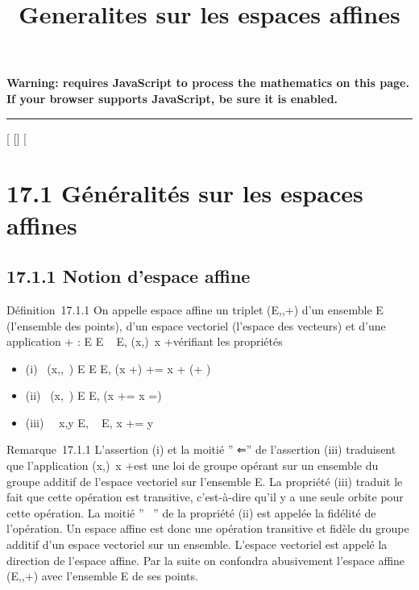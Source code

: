 \documentclass[]{article}
\title{Generalites sur les espaces affines}
\author{}
\date{}
\begin{document}
\maketitle

\textbf{Warning: 
requires JavaScript to process the mathematics on this page.\\ If your
browser supports JavaScript, be sure it is enabled.}

\begin{center}\rule{3in}{0.4pt}\end{center}

[
[]
[

\section{17.1 Généralités sur les espaces affines}

\subsection{17.1.1 Notion d'espace affine}

Définition~17.1.1 On appelle espace affine un triplet
(E,\overrightarrowE,+) d'un ensemble E (l'ensemble
des points), d'un espace vectoriel \overrightarrowE
(l'espace des vecteurs) et d'une application + : E
\times\overrightarrow E \rightarrow~ E,
(x,\overrightarrow\xi)\mapsto~x
+\overrightarrow \xi vérifiant les propriétés

\begin{itemize}
\itemsep1pt\parskip0pt
\item
  (i)
  \forall~(x,\overrightarrow\xi,\overrightarrow\eta~)
  \in E \times\overrightarrow E
  \times\overrightarrow E, (x
  +\overrightarrow \xi)
  +\overrightarrow \eta = x +
  (\overrightarrow\xi +\overrightarrow
  \eta)
\item
  (ii)
  \forall~(x,\overrightarrow\xi~) \in E
  \times\overrightarrow E, \left (x
  +\overrightarrow \xi = x \Leftrightarrow
  \overrightarrow\xi =\right )
\item
  (iii) \forall~~x,y \in E,
  \exists\overrightarrow\xi~
  \in\overrightarrow E, x
  +\overrightarrow \xi = y
\end{itemize}

Remarque~17.1.1 L'assertion (i) et la moitié '' ⇐'' de l'assertion (iii)
traduisent que l'application
(x,\overrightarrow\xi)\mapsto~x
+\overrightarrow \xi est une loi de groupe opérant sur
un ensemble du groupe additif de l'espace vectoriel
\overrightarrowE sur l'ensemble E. La propriété (iii)
traduit le fait que cette opération est transitive, c'est-à-dire qu'il y
a une seule orbite pour cette opération. La moitié '' \rigtharrow~'' de la
propriété (ii) est appelée la fidélité de l'opération. Un espace affine
est donc une opération transitive et fidèle du groupe additif d'un
espace vectoriel sur un ensemble. L'espace vectoriel
\overrightarrowE est appelé la direction de l'espace
affine. Par la suite on confondra abusivement l'espace affine
(E,\overrightarrowE,+) avec l'ensemble E de ses
points.
\end{document}
